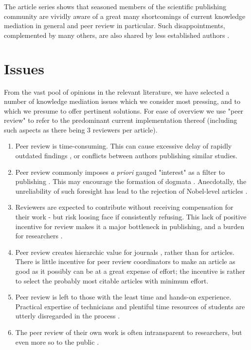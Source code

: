 The article series shows that seasoned members of the scientific publishing community are vividly aware of a great many shortcomings of current knowledge mediation in general and peer review in particular.
Such disappointments, complemented by many others, are also shared by less established authors \cite{Mainguy2005}.

\section{Issues}
From the vast pool of opinions in the relevant literature, we have selected a number of knowledge mediation issues which we consider most pressing, and to which we presume to offer pertinent solutions. For ease of overview we use "peer review" to refer to the predominant current implementation thereof (including such aspects as there being 3 reviewers per article).
\begin{enumerate}
	\item Peer review is time-consuming.
	This can cause excessive delay of rapidly outdated findings \cite{Riley2006}, or conflicts between authors publishing similar studies.
	\item Peer review commonly imposes \textit{a priori} gauged "interest" as a filter to publishing \cite{Bloom2006}. 
	This may encourage the formation of dogmata \cite{Akerman2006}. 
	Anecdotally, the unreliability of such foresight has lead to the rejection of Nobel-level articles \cite{Nature2003}.
	\item Reviewers are expected to contribute without receiving compensation for their work - but risk loosing face if consistently refusing.
	This lack of positive incentive for review makes it a major bottleneck in publishing, and a burden for researchers \cite{Koop2006}.
	\item Peer review creates hierarchic value for journals \cite{Jennings2006,Wager2006}, rather than for articles. 
	There is little incentive for peer review coordinators to make an article as good as it possibly can be at a great expense of effort;
	the incentive is rather to select the probably most citable articles with minimum effort.
	\item Peer review is left to those with the least time and hands-on experience.
	Practical expertise of technicians and plentiful time resources of students are utterly disregarded in the process \cite{Lahiri2006}.
	\item The peer review of their own work is often intransparent to researchers, but even more so to the public \cite{Brown2006}.
\end{enumerate}
